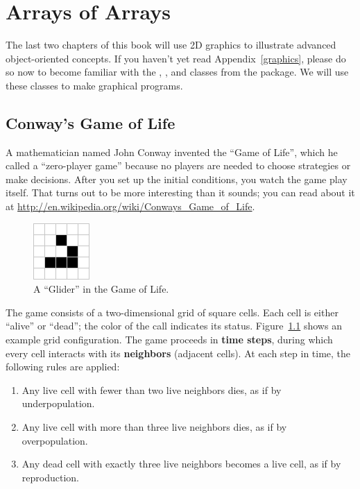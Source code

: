 \chapter{Arrays of Arrays}

The last two chapters of this book will use 2D graphics to illustrate advanced object-oriented concepts.
If you haven't yet read Appendix~\ref{graphics}, please do so now to become familiar with the , , and  classes from the  package.
We will use these classes to make graphical programs.


\section{Conway's Game of Life}

A mathematician named John Conway invented the ``Game of Life'', which he called a ``zero-player game'' because no players are needed to choose strategies or make decisions.
After you set up the initial conditions, you watch the game play itself.
That turns out to be more interesting than it sounds; you can read about it at \url{http://en.wikipedia.org/wiki/Conways_Game_of_Life}.

\begin{figure}[!ht]
\begin{center}
\includegraphics{figs/glider.png}
\caption{A ``Glider'' in the Game of Life.}
\label{fig:glider}
\end{center}
\end{figure}

The game consists of a two-dimensional grid of square cells.
Each cell is either ``alive'' or ``dead''; the color of the call indicates its status.
Figure~\ref{fig:glider} shows an example grid configuration.
The game proceeds in {\bf time steps}, during which every cell interacts with its {\bf neighbors} (adjacent cells).
At each step in time, the following rules are applied:

\begin{enumerate}
\item Any live cell with fewer than two live neighbors dies, as if by underpopulation.
\item Any live cell with more than three live neighbors dies, as if by overpopulation.
\item Any dead cell with exactly three live neighbors becomes a live cell, as if by reproduction.
\end{enumerate}

